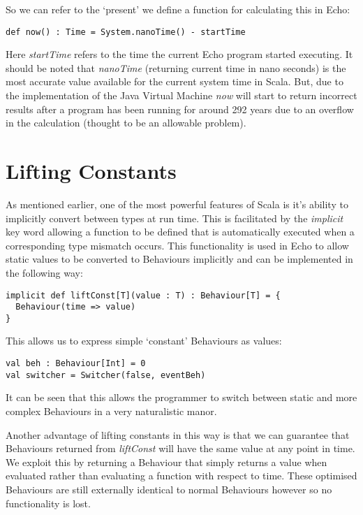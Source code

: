     So we can refer to the `present' we define a function for calculating this in Echo:
    
\begin{verbatim}
def now() : Time = System.nanoTime() - startTime
\end{verbatim}      

    Here \emph{startTime} refers to the time the current Echo program started executing. It should be noted that \emph{nanoTime} (returning current time in
    nano seconds) is the most accurate value available for the current system time in Scala. But, due to the
    implementation of the Java Virtual Machine \emph{now} will start to return incorrect results 
    after a program has been running for around 292 years due to an overflow in the calculation (thought to be an allowable
    problem).

  \section{Lifting Constants}
    As mentioned earlier, one of the most powerful features of Scala is it's ability to implicitly convert between
    types at run time. This is facilitated by the \emph{implicit} key word allowing a function to be defined
    that is automatically executed when a corresponding type mismatch occurs. This functionality is used in Echo to allow 
    static values to be converted to Behaviours implicitly and can be implemented in the following way:

\begin{verbatim}
implicit def liftConst[T](value : T) : Behaviour[T] = {
  Behaviour(time => value)
}
\end{verbatim}              
    
    This allows us to express simple `constant' Behaviours as values:

\begin{verbatim}
val beh : Behaviour[Int] = 0
val switcher = Switcher(false, eventBeh)
\end{verbatim}       

    It can be seen that this allows the programmer to switch between static and more complex
    Behaviours in a very naturalistic manor.
    
    Another advantage of lifting constants in this way is that we can guarantee that Behaviours
    returned from \emph{liftConst} will have the same value at any point in time. We exploit this by returning a Behaviour
    that simply returns a value when evaluated rather than evaluating a function with respect to time. These optimised Behaviours are still externally identical to normal Behaviours however so no functionality is lost.
    
